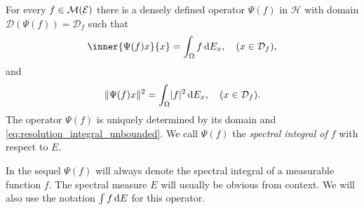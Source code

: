 \documentclass[article, a4paper, 11pt, oneside]{memoir}
\numberwithin{equation}{chapter}
\newcommand{\calH}{\mathcal{H}}
\newcommand{\calE}{\mathcal{E}}
\newcommand{\dom}{\mathcal{D}}
\theoremstyle{myexample}
\theoremstyle{myexample}
\theoremstyle{myexamplebreak}
\theoremstyle{myexamplebreak}
\theoremstyle{nonumberplain}
\theoremstyle{MyNonumberplain}
\begin{document}
\begin{theorem}
    \label{thm:resolution_integral_unbounded}
    For every $f \in \measurable(\calE)$ there is a densely defined operator $\Psi(f)$ in $\calH$ with domain $\dom(\Psi(f)) = \dom_f$ such that
    \begin{equation}
        \label{eq:resolution_integral_unbounded}
        \inner{\Psi(f)x}{x} = \int_\Omega f \dif E_x,
        \quad (x \in \dom_f),
    \end{equation}
    and
    \begin{equation}
        \label{eq:integral_norm_squared}
        \norm{\Psi(f)x}^2 = \int_\Omega \abs{f}^2 \dif E_x,
        \quad (x \in \dom_f).
    \end{equation}
    The operator $\Psi(f)$ is uniquely determined by its domain and \eqref{eq:resolution_integral_unbounded}. We call $\Psi(f)$ the \emph{spectral integral of $f$} with respect to $E$.
\end{theorem}
%
In the sequel $\Psi(f)$ will always denote the spectral integral of a measurable function $f$. The spectral measure $E$ will usually be obvious from context. We will also use the notation $\int f \mathop{}\!\mathrm{d} E$ for this operator.
\end{document}
